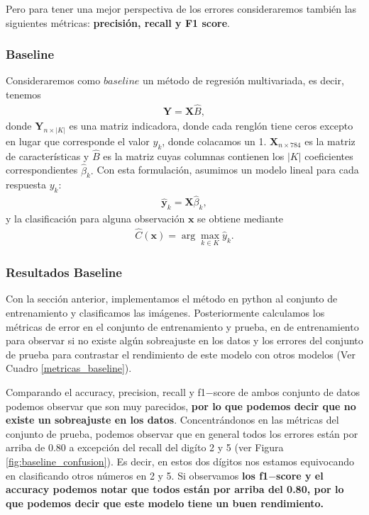 \documentclass[paper=letter, fontsize=11pt]{scrartcl}
\newcommand{\xb}{\mathbf{x}}
\newcommand{\Xb}{\mathbf{X}}
\newcommand{\yb}{\mathbf{y}}
\newcommand{\Yb}{\mathbf{Y}}
\numberwithin{equation}{section} %
\numberwithin{figure}{section} %
\numberwithin{table}{section} %
\begin{document}
Pero para tener una mejor perspectiva de los errores consideraremos también las siguientes métricas: \textbf{precisión, recall y F1 score}. 

\subsubsection{Baseline}
Consideraremos como $baseline$ un método de regresión multivariada, es decir, tenemos 
\begin{align*}
    \Yb = \Xb \hat{B},
\end{align*}
donde $\Yb_{n\times |K|}$ es una matriz indicadora, donde cada renglón tiene ceros excepto en lugar que corresponde el valor $y_k$, donde colacamos un 1. $\Xb_{n\times 784}$ es la matriz de características y $\hat{B}$ es la matriz cuyas columnas contienen los $|K|$ coeficientes correspondientes $\hat{\beta}_k.$ Con esta formulación, asumimos un modelo lineal para cada respuesta $y_k:$
\begin{align*}
    \hat{\yb}_k=\Xb\hat{\beta}_k,
\end{align*}
y la clasificación para alguna observación $\xb$ se obtiene mediante 
\begin{align*}
    \hat{C}(\xb)=\arg \max_{k\in K}\hat{y}_k.
\end{align*}
\subsubsection{Resultados Baseline}
Con la sección anterior,   implementamos el método en python al conjunto de entrenamiento y clasificamos las imágenes. Posteriormente calculamos los métricas de error en el conjunto de entrenamiento y prueba, en de entrenamiento para observar si no existe algún sobreajuste en los datos y los errores del conjunto de prueba para contrastar el rendimiento de este modelo con otros modelos (Ver Cuadro \ref{metricas_baseline}).

Comparando el accuracy, precision, recall y f1$-$score de ambos conjunto de datos podemos observar que son muy parecidos, \textbf{por lo que podemos decir que no existe un sobreajuste en los datos}. Concentrándonos en las métricas del conjunto de prueba, podemos observar que en general todos los errores están por arriba de 0.80 a excepción del recall del digíto 2 y 5 (ver Figura \ref{fig:baseline_confusion}). Es decir, en estos dos dígitos nos estamos equivocando en clasificando otros números en 2 y 5. Si observamos \textbf{los f1$-$score y el accuracy podemos notar que todos están por arriba del 0.80, por lo que podemos decir que este modelo tiene un buen rendimiento.}
\end{document}
